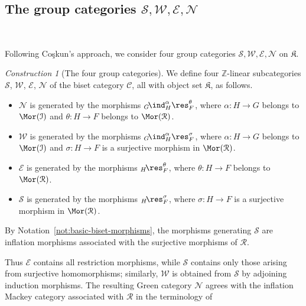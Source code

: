 \documentclass{amsart}
\numberwithin{equation}{section}%
\theoremstyle{remark}
\newtheorem{Cons}[equation]{Construction}
\theoremstyle{definition}
\newcommand{\e}{\mathcal E}
\newcommand{\s}{\mathcal S}
\newcommand{\n}{\mathcal N}
\newcommand{\w}{\mathcal W}
\newcommand{\lind}[1]{{}_{#1}\!\ind}
\newcommand{\lres}[1]{{}_{#1}\!\res}
\begin{document}
%
\subsection{The group categories $\mathcal S,\mathcal W,\mathcal E,\mathcal N$}\
\label{ssec:four-group-categories}
%

Following Co\c{s}kun's \cite{Coskun07} approach, we consider four group categories
$\mathcal S,\mathcal W,\mathcal E,\mathcal N$ on $\mathfrak K$.
%
\begin{Cons}[The four group categories]
\label{con:four-group-categories}
We define four $\mathbb Z$-linear subcategories
$\s$, $\w$, $\e$, $\n$ of the biset category
$\mathcal C$, all with object set $\mathfrak K$, as follows.


\begin{itemize}
\item $\mathcal N$ is generated by the morphisms
$\lind{G}_H^\alpha\res_F^\theta$,
where $\alpha\colon H\to G$ belongs to $\Mor(\mathcal I)$
and $\theta\colon H\to F$ belongs to $\Mor(\mathcal R)$.
	
\item $\mathcal W$ is generated by the morphisms
$\lind{G}_H^\alpha\res_F^\sigma$, 
where $\alpha\colon H\to G$ belongs to $\Mor(\mathcal I)$
and $\sigma\colon H\to F$ is a surjective morphism in
$\Mor(\mathcal R)$.
	
\item $\mathcal E$ is generated by the morphisms
$\lres{H}_F^\theta$, where $\theta\colon H\to F$ belongs to $\Mor(\mathcal R)$.
	
\item $\mathcal S$ is generated by the morphisms
$\lres{H}_F^\sigma$, where $\sigma\colon H\to F$ is a surjective morphism in
$\Mor(\mathcal R)$.
\end{itemize}


By Notation~\ref{not:basic-biset-morphisms}, the morphisms
generating $\mathcal S$ are inflation morphisms associated with
the surjective morphisms of $\mathcal R$.
\end{Cons}
%
Thus $\mathcal E$ contains all restriction morphisms, while
$\mathcal S$ contains only those arising from surjective
homomorphisms; similarly, $\mathcal W$ is obtained from
$\mathcal S$ by adjoining induction morphisms.
The resulting Green category $\mathcal N$ agrees with the inflation
Mackey category associated with $\mathcal R$ in the terminology of
\end{document}
